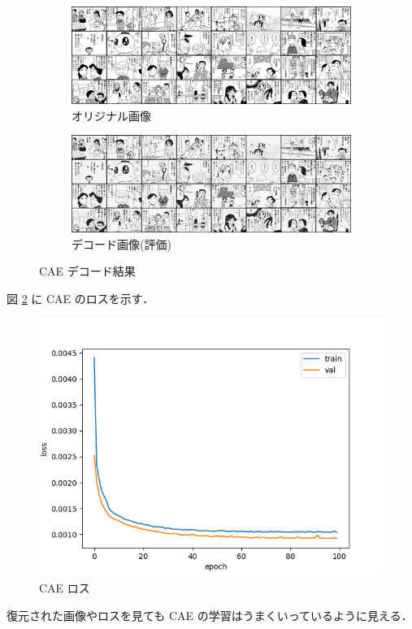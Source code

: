 \documentclass[onecolumn]{ujarticle}   %
\begin{document}
	\begin{figure}[hb]
		\centering
		\begin{subfigure}{1.0\columnwidth}
			\centering
			\includegraphics[width=1.0\columnwidth]{data/val_original.png}
				\caption{オリジナル画像}
		\end{subfigure}
		\begin{subfigure}{1.0\columnwidth}
			\centering
			\includegraphics[width=1.0\columnwidth]{data/val_decoded.png}
				\caption{デコード画像(評価)}
		\end{subfigure}
		\caption{CAE デコード結果}
		\label{fig:CAE}
	\end{figure}

	図 \ref{fig:CAE_loss} に CAE のロスを示す．
	\begin{figure}[htb]
		\centering
		\includegraphics[width=0.5\columnwidth]{data/CAE_loss.png}
		\caption{CAE ロス}
		\label{fig:CAE_loss}
	\end{figure}

	復元された画像やロスを見ても CAE の学習はうまくいっているように見える．
\end{document}
